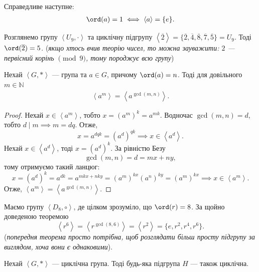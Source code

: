 \documentclass{math_library}
\begin{document}
\begin{remark}
Справедливе наступне:
\begin{align*}
\ord(a) = 1 \iff \left<a\right> = \{e\}.
\end{align*}
\end{remark}

\begin{example}
Розглянемо групу $\left< U_9, \cdot \right>$ та циклічну підгрупу $\left<\overline{2}\right> = \{ \overline{2}, \overline{4}, \overline{8}, \overline{7}, \overline{5} \} = U_9$. Тоді $\ord (\overline{2}) = 5$. (\textit{якщо хтось вчив теорію чисел, то можна зауважити: $2$ --- первісний корінь $\pmod 9$, тому породжує всю групу})
\end{example}

\begin{theorem}
Нехай $\left<G, *\right>$ --- група та $a \in G$, причому $\ord (a) = n$. Тоді для довільного $m \in \mathbb{N}$
\begin{align*}
\left<a^m\right> = \left<a^{\gcd(m,n)}\right>.
\end{align*}
\end{theorem}

\begin{proof}
Нехай $x \in \left<a^m\right>$, тобто $x = (a^m)^k = a^{mk}$. Водночас $\gcd(m,n) = d$, тобто $d \mid m \implies m = dq$. Отже,\[
x = a^{dqk} = (a^d)^{qk} \implies x \in \left<a^{d}\right>.
\]
Нехай $x \in \left<a^d\right>$, тоді $x = (a^d)^k$. За рівністю Безу \[ 
\gcd(m,n) = d = mx + ny,
\] тому отримуємо такий ланцюг:
\[
x= (a^d)^k = a^{dk} = a^{mkx + nky} = (a^{m})^{kx} (a^{n})^{ky} = (a^m)^{kx} \implies x \in \left<a^m\right>. 
\]
Отже, $\left<a^m\right> = \left<a^{\gcd(m,n)}\right>$.
\end{proof}

\begin{example}
Маємо групу $\left< D_{8}, \circ \right>$, де цілком зрозуміло, що $\ord (r) = 8$. За щойно доведеною теоремою 
\[
\left<r^6\right> = \left<r^{\gcd(8,6)}\right> = \left<r^2\right> = \{e,r^2,r^4,r^6\}.
\]
(\textit{попередня теорема просто потрібна, щоб розглядати більш просту підгрупу за виглядом, хоча вони є однаковими}).
\end{example}

\begin{theorem}
Нехай $\left< G, *\right>$ --- циклічна група. Тоді будь-яка підгрупа $H$ --- також циклічна.
\end{theorem}
\end{document}
